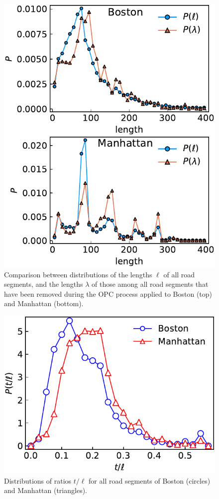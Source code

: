 \documentclass[aps,prl,twocolumn,showpacs, superscriptaddress,floatfix, 10pt]{revtex4-1}
\begin{document}
\begin{figure}[H]
	\centering
	\includegraphics[width=0.8\columnwidth]{figS2} 
\caption{ Comparison between distributions of the lengths $\ell$ of all
road segments, and the lengths $\lambda$ of those among all road segments
that have been removed  during the OPC process applied to Boston (top) and
Manhattan (bottom).}
\end{figure}

\begin{figure}[H]
	\centering
	\includegraphics[width=0.8\columnwidth]{figS3} 
\caption{Distributions of ratios $t/\ell$ for all road segments of Boston
(circles) and Manhattan (triangles).}
\end{figure}
\end{document}
